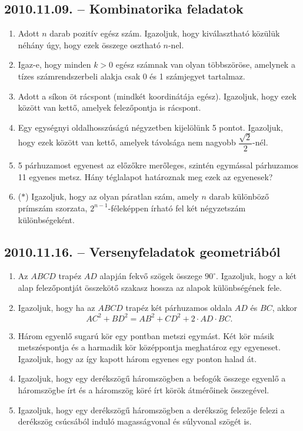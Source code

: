 \subsection*{2010.11.09. -- Kombinatorika feladatok}
\begin{enumerate}
\item Adott $n$ darab pozitív egész szám. Igazoljuk, hogy kiválasztható közülük néhány úgy, hogy ezek összege osztható $n$-nel.
\item Igaz-e, hogy minden $k>0$ egész számnak van olyan többszöröse, amelynek a 
tízes számrendszerbeli alakja csak 0 és 1 számjegyet tartalmaz.
\item Adott a síkon öt rácspont (mindkét koordinátája egész). Igazoljuk, hogy ezek között van kettő, amelyek felezőpontja is rácspont.
\item Egy egységnyi oldalhosszúságú négyzetben kijelölünk 5 pontot. Igazoljuk, hogy ezek között van kettő, amelyek távolsága nem nagyobb $\dfrac{\sqrt 2}{2}$-nél.
\item 5 párhuzamost egyenest az előzőkre merőleges, szintén egymással párhuzamos 11 egyenes metsz. Hány téglalapot határoznak meg ezek az egyenesek?
\item ($*$) Igazoljuk, hogy az olyan páratlan szám, amely $n$ darab különböző prímszám szorzata, $2^{n-1}$-féleképpen írható fel két négyzetszám különbségeként.
\end{enumerate}

\subsection*{2010.11.16. -- Versenyfeladatok geometriából}
\begin{enumerate}
\item Az $ABCD$ trapéz $AD$ alapján fekvő szögek összege $90^\circ$. Igazoljuk, hogy a két alap felezőpontját összekötő szakasz hossza az alapok különbségének fele.
\item Igazoljuk, hogy ha az $ABCD$ trapéz két párhuzamos oldala $AD$ és $BC$, akkor $$AC^2+BD^2=AB^2+CD^2+2\cdot AD\cdot BC.$$
\item Három egyenlő sugarú kör egy pontban metszi egymást. Két kör másik metszéspontja és a harmadik kör középpontja meghatároz egy egyeneset. Igazoljuk, hogy az így kapott három egyenes egy ponton halad át.
\item Igazoljuk, hogy egy derékszögű háromszögben a befogók összege egyenlő a háromszögbe írt és a háromszög köré írt körök átmérőinek összegével.
\item Igazoljuk, hogy egy derékszögű háromszögben a derékszög felezője felezi a derékszög csúcsából induló magasságvonal és súlyvonal szögét is.
\end{enumerate}

